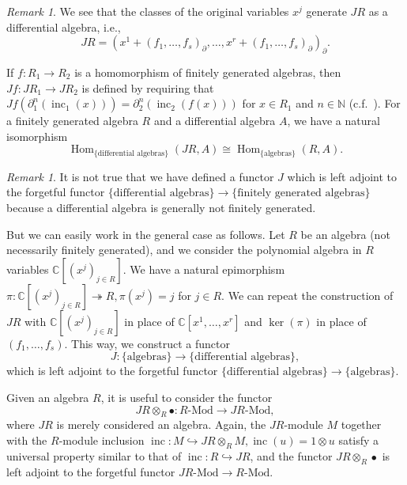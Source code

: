 \documentclass[a4paper, 12pt, reqno]{amsart}
\theoremstyle{remark}
\newtheorem{remark}[theorem]{Remark}
\DeclareMathOperator{\Hom}{Hom}
\DeclareMathOperator{\inc}{inc}
\begin{document}
\begin{remark}
  \label{rmk:6}
  We see that the classes of the original variables $x^j$ generate $JR$ as a differential algebra, i.e.,
  \begin{equation*}
    JR = (x^1 + (f_1, \dots, f_s)_{\partial}, \dots, x^r + (f_1, \dots, f_s)_{\partial})_{\partial}.
  \end{equation*}
\end{remark}

If $f: R_1 \to R_2$ is a homomorphism of finitely generated algebras, then $Jf: JR_1 \to JR_2$ is defined by requiring that $Jf(\partial_1^n(\inc_1(x))) = \partial^n_2(\inc_2(f(x)))$ for $x \in R_1$ and $n \in \mathbb{N}$ (c.f.\ ).
For a finitely generated algebra $R$ and a differential algebra $A$, we have a natural isomorphism
\begin{equation*}
  \Hom_{\{\text{differential algebras}\}}(JR, A) \cong \Hom_{\{\text{algebras}\}}(R, A).
\end{equation*}

\begin{remark}
  \label{rmk:7}
  It is not true that we have defined a functor $J$ which is left adjoint to the forgetful functor $\{\text{differential algebras}\} \to \{\text{finitely generated algebras}\}$ because a differential algebra is generally not finitely generated.

  But we can easily work in the general case as follows.
  Let $R$ be an algebra (not necessarily finitely generated), and we consider the polynomial algebra in $R$ variables $\mathbb{C}[(x^j)_{j \in R}]$.
  We have a natural epimorphism $\pi: \mathbb{C}[(x^j)_{j \in R}] \twoheadrightarrow R, \pi(x^j) = j$ for $j \in R$.
  We can repeat the construction of $JR$ with $\mathbb{C}[(x^j)_{j \in R}]$ in place of $\mathbb{C}[x^1, \dots, x^r]$ and $\ker(\pi)$ in place of $(f_1, \dots, f_s)$.
  This way, we construct a functor
  \begin{equation*}
    J: \{\text{algebras}\} \to \{\text{differential algebras}\},
  \end{equation*}
  which is left adjoint to the forgetful functor $\{\text{differential algebras}\} \to \{\text{algebras}\}$.
\end{remark}

Given an algebra $R$, it is useful to consider the functor
\begin{equation*}
  JR \otimes_R \bullet: \text{$R$-Mod} \to \text{$JR$-Mod},
\end{equation*}
where $JR$ is merely considered an algebra.
Again, the $JR$-module $M$ together with the $R$-module inclusion $\inc: M \hookrightarrow JR \otimes_R M, \inc(u) = 1\otimes u$ satisfy a universal property similar to that of $\inc: R \hookrightarrow JR$, and the functor $JR \otimes_R \bullet$ is left adjoint to the forgetful functor $\text{$JR$-Mod} \to \text{$R$-Mod}$.
\end{document}
